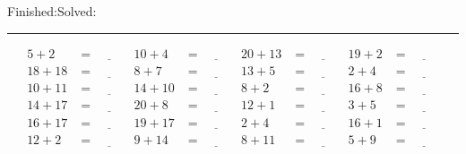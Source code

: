 \documentclass{article}
\begin{document}
\begin{sloppy}
\begin{center}
{\selectfont {Started:}\underline{\hspace{1.5cm}}{Finished:}\underline{\hspace{1.5cm}}{Solved:}\underline{\hspace{1.5cm}}}
\end{center}
\hrule
\begin{align*}
    {5} + {2} &= \underline{\hspace{1cm}} & {10} + {4} &= \underline{\hspace{1cm}} & {20} + {13} &= \underline{\hspace{1cm}} & {19} + {2} &= \underline{\hspace{1cm}} \\
    {18} + {18} &= \underline{\hspace{1cm}} & {8} + {7} &= \underline{\hspace{1cm}} & {13} + {5} &= \underline{\hspace{1cm}} & {2} + {4} &= \underline{\hspace{1cm}} \\
    {10} + {11} &= \underline{\hspace{1cm}} & {14} + {10} &= \underline{\hspace{1cm}} & {8} + {2} &= \underline{\hspace{1cm}} & {16} + {8} &= \underline{\hspace{1cm}} \\
    {14} + {17} &= \underline{\hspace{1cm}} & {20} + {8} &= \underline{\hspace{1cm}} & {12} + {1} &= \underline{\hspace{1cm}} & {3} + {5} &= \underline{\hspace{1cm}} \\
    {16} + {17} &= \underline{\hspace{1cm}} & {19} + {17} &= \underline{\hspace{1cm}} & {2} + {4} &= \underline{\hspace{1cm}} & {16} + {1} &= \underline{\hspace{1cm}} \\
    {12} + {2} &= \underline{\hspace{1cm}} & {9} + {14} &= \underline{\hspace{1cm}} & {8} + {11} &= \underline{\hspace{1cm}} & {5} + {9} &= \underline{\hspace{1cm}} \\

\end{align*}
\end{sloppy}
\end{document}
